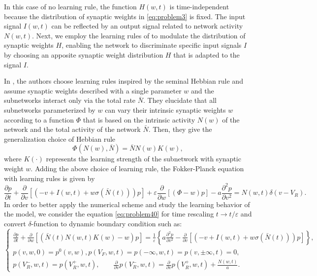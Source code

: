 In this case of no learning rule, the function $H(w,t)$ is time-independent because the distribution of synaptic weights in \eqref{eq:problem3} is fixed. The input signal $I(w,t)$ can be reflected by an output signal related to network activity $N(w,t)$. Next, we employ the learning rules of \cite{perthame2017distributed} to modulate the distribution of synaptic weights $H$, enabling the network to discriminate specific input signals $I$ by choosing an apposite synaptic weight distribution $H$ that is adapted to the signal $I$.


In \cite{perthame2017distributed}, the authors choose learning rules inspired by the seminal Hebbian rule and assume synaptic weights described with a single parameter $w$ and the subnetworks interact only via the total rate $\bar{N}$. They elucidate that all subnetworks parameterized by $w$ can vary their intrinsic synaptic weights $w$ according to a function $\Phi$ that is based on the intrinsic activity $N(w)$ of the network and the total activity of the network $\bar{N}$. Then, they give the generalization choice of Hebbian rule
\begin{equation}
    \Phi(N(w), \bar{N})=\bar{N} N(w) K(w),
\end{equation}
where $K(\cdot)$ represents the learning strength of the subnetwork with synaptic weight $w$. Adding the above choice of learning rule, the Fokker-Planck equation with learning rules is given by
\begin{equation}
    \label{eq:problem40}
    \frac{\partial p}{\partial t}+\frac{\partial}{\partial v}[(-v+I(w,t)+w \sigma(\bar{N}(t))) p]+\varepsilon \frac{\partial}{\partial w}[(\Phi-w) p]-a \frac{\partial^{2} p}{\partial v^{2}}=N(w, t) \delta\left(v-V_{R}\right).
\end{equation}
In order to better apply the numerical scheme and study the learning behavior of the model, we consider the equation \eqref{eq:problem40} for time rescaling $t \rightarrow t / \varepsilon$ and convert $\delta$-function to dynamic boundary condition such as:
\begin{equation}
    \label{eq:problem4}
    \begin{cases}
        \displaystyle
        \frac{\partial p}{\partial t}+\frac{\partial}{\partial w}[(\bar{N}(t)N(w,t)K(w)-w)p]
        =\frac{1}{\varepsilon}\left\{a\frac{\partial^2p}{\partial v^2}-\frac{\partial}{\partial v}[(-v+I(w,t)+w\sigma(\bar{N}(t)))p]\right\},\\
        p(v,w,0)=p^0(v,w),p(V_F,w,t)=p(-\infty,w,t)=p(v,\pm \infty,t)=0,\\
        p(V_R^-,w,t)=p(V_R^+,w,t),\qquad \frac{\partial}{\partial v}p(V^-_R,w,t)=\frac{\partial}{\partial v}p(V^+_R,w,t)+\frac{N(w,t)}{a}.
    \end{cases}
\end{equation}

